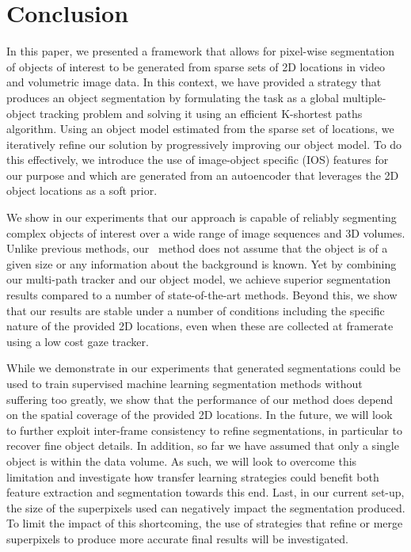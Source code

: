 \section{Conclusion}
\label{sec:conclusion}
In this paper, we presented a framework that allows for pixel-wise segmentation of objects of interest to be generated from sparse sets of 2D locations in video and volumetric image data. In this context, we have provided a strategy that produces an object segmentation by formulating the task as a global multiple-object tracking problem and solving it using an efficient K-shortest paths algorithm. Using an object model estimated from the sparse set of locations, we iteratively refine our solution by progressively improving our object model. To do this effectively, we introduce the use of image-object specific (IOS) features for our purpose and which are generated from an autoencoder that leverages the 2D object locations as a soft prior. 

We show in our experiments that our approach is capable of reliably segmenting complex objects of interest over a wide range of image sequences and 3D volumes. Unlike previous methods, our \KSP ~method does not assume that the object is of a given size or any information about the background is known. Yet by combining our multi-path tracker and our object model, we achieve superior segmentation results compared to a number of state-of-the-art methods. Beyond this, we show that our results are stable under a number of conditions including the specific nature of the provided 2D locations, even when these are collected at framerate using a low cost gaze tracker.

While we demonstrate in our experiments that generated segmentations could be used to train supervised machine learning segmentation methods without suffering too greatly, we show that the performance of our method does depend on the spatial coverage of the provided 2D locations. In the future, we will look to further exploit inter-frame consistency to refine segmentations, in particular to recover fine object details. In addition, so far we have assumed that only a single object is within the data volume. As such, we will look to overcome this limitation and investigate how transfer learning strategies could benefit both feature extraction and segmentation towards this end. Last, in our current set-up, the size of the superpixels used can negatively impact the segmentation produced. To limit the impact of this shortcoming, the use of strategies that refine or merge superpixels to produce more accurate final results will be investigated.


